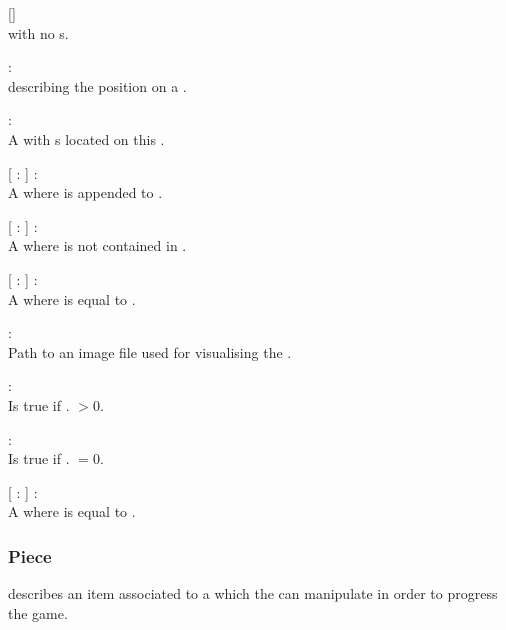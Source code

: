 \begin{dlist}
  \item {}[]\\
     with no s.
  \item {} : \\
     describing the position on a .
  \item {} : \\
    A  with s located on this .
  \item {}[  :  ] : \\
    A  where  is appended to .
  \item {}[  :  ] : \\
    A  where  is not contained in .
  \item {}[  :  ] : \\
    A  where  is equal to .
  \item {} : \\
    Path to an image file used for visualising the .
  \item {} : \\
    Is true if . $> 0$.
  \item {} : \\
    Is true if . $= 0$.
  \item {}[  :  ] : \\
    A  where  is equal to .
\end{dlist}

\subsubsection{Piece}
 describes an item associated to a  which the
 can manipulate in order to progress the game.


